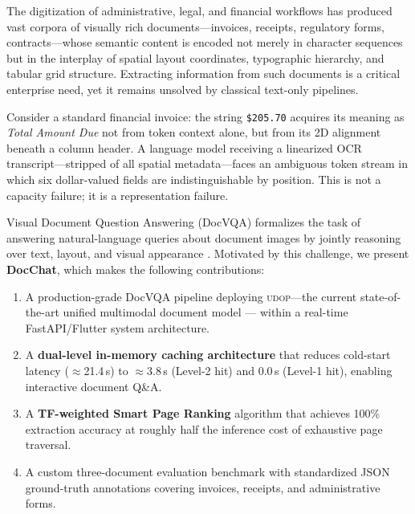 \documentclass[conference]{IEEEtran}
\newcommand{\udop}{\textsc{udop}}
\newcommand{\docvqa}{DocVQA}
\begin{document}
The digitization of administrative, legal, and financial workflows has produced
vast corpora of visually rich documents---invoices, receipts, regulatory forms,
contracts---whose semantic content is encoded not merely in character sequences
but in the interplay of spatial layout coordinates, typographic hierarchy, and
tabular grid structure. Extracting information from such documents is a critical
enterprise need, yet it remains unsolved by classical text-only pipelines.

Consider a standard financial invoice: the string \texttt{\$205.70} acquires
its meaning as \emph{Total Amount Due} not from token context alone, but from
its 2D alignment beneath a column header. A language model receiving a
linearized OCR transcript---stripped of all spatial metadata---faces an
ambiguous token stream in which six dollar-valued fields are
indistinguishable by position. This is not a capacity failure; it is a
representation failure.

Visual Document Question Answering (\docvqa) formalizes the task of answering
natural-language queries about document images by jointly reasoning over text,
layout, and visual appearance \cite{b_mathew2021}. Motivated by this challenge,
we present \textbf{DocChat}, which makes the following contributions:

\begin{enumerate}
    \item A production-grade \docvqa{} pipeline deploying \udop---the current
          state-of-the-art unified multimodal document model \cite{b_tang2023}---
          within a real-time FastAPI/Flutter system architecture.

    \item A \textbf{dual-level in-memory caching architecture} that reduces
          cold-start latency (${\approx}$21.4\,s) to ${\approx}$3.8\,s (Level-2
          hit) and 0.0\,s (Level-1 hit), enabling interactive document Q\&A.

    \item A \textbf{TF-weighted Smart Page Ranking} algorithm that achieves
          100\% extraction accuracy at roughly half the inference cost of
          exhaustive page traversal.

    \item A custom three-document evaluation benchmark with standardized
          JSON ground-truth annotations covering invoices, receipts, and
          administrative forms.
\end{enumerate}
\end{document}
